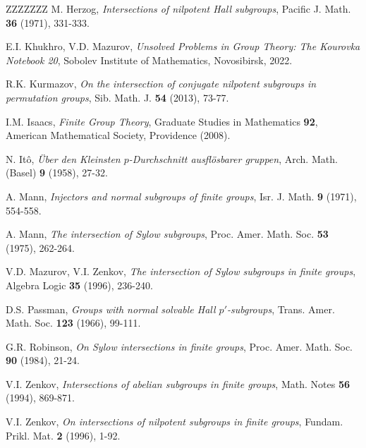 \documentclass[11pt]{amsart}
\numberwithin{equation}{section}
\theoremstyle{definition}
\theoremstyle{remark}
\begin{document}
\begin{thebibliography}{ZZZZZZZ}
 M. Herzog,
   \textit{Intersections of nilpotent Hall subgroups},
   Pacific J. Math. \textbf{36} (1971), 331-333.

 E.I. Khukhro, V.D. Mazurov,
 \textit{Unsolved Problems in Group Theory: The Kourovka Notebook 20}, 
Sobolev Institute of Mathematics, Novosibirsk, 2022.

 R.K. Kurmazov,
   \textit{On the intersection of conjugate nilpotent subgroups in permutation groups},
   Sib. Math. J. \textbf{54} (2013), 73-77.

 I.M. Isaacs,
\textit{Finite Group Theory},
Graduate Studies in Mathematics \textbf{92},
American Mathematical Society, Providence (2008).

 N. It\^o,
   \textit{\"Uber den Kleinsten $p$-Durchschnitt ausfl\"osbarer gruppen},
   Arch. Math. (Basel) \textbf{9} (1958), 27-32.
   
    A. Mann,
   \textit{Injectors and normal subgroups of finite groups},
   Isr. J. Math. \textbf{9} (1971), 554-558.

  A. Mann,
   \textit{The intersection of Sylow subgroups},
   Proc. Amer. Math. Soc. \textbf{53} (1975), 262-264.
   
    V.D. Mazurov, V.I. Zenkov,
   \textit{The intersection of Sylow subgroups in finite groups},
   Algebra Logic \textbf{35} (1996), 236-240.

 D.S. Passman,
\textit{Groups with normal solvable Hall $p'$-subgroups},
Trans. Amer. Math. Soc. \textbf{123} (1966), 99-111.

 G.R. Robinson,
   \textit{On Sylow intersections in finite groups},
   Proc. Amer. Math. Soc. \textbf{90} (1984), 21-24.
   
     V.I. Zenkov,
   \textit{Intersections of abelian subgroups in finite groups},
   Math. Notes \textbf{56} (1994), 869-871.
   
      V.I. Zenkov,
  \textit{On intersections of nilpotent subgroups in finite groups},
   Fundam. Prikl. Mat. \textbf{2} (1996), 1-92.

   \end{thebibliography}
   
   \vspace{0.5cm}
\end{document}
